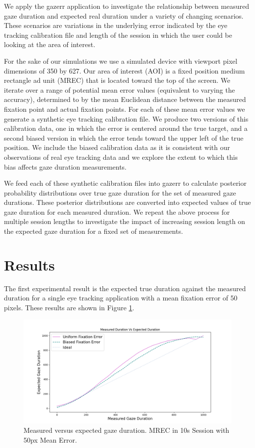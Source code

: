 \documentclass[12pt,a4paper]{article}
\numberwithin{equation}{section}
\begin{document}
We apply the gazerr application to investigate the relationship between measured gaze duration
and expected real duration under a variety of changing scenarios. These scenarios are variations
in the underlying error indicated by the eye tracking calibration file and length of the session
in which the user could be looking at the area of interest.

For the sake of our simulations we use a simulated device with viewport pixel 
dimensions of 350 by 627. Our area of interest (AOI) is a fixed position medium rectangle ad unit (MREC)
that is located toward the top of the screen. We iterate over a range of potential mean error
values (equivalent to varying the accuracy), determined to by the mean Euclidean distance 
between the measured fixation point and actual fixation points.
For each of these mean error values we generate a synthetic eye tracking calibration file. We produce
two versions of this calibration data, one in which the error is centered around the true target,
and a second biased version in which the error tends toward the upper left of the true position. We 
include the biased calibration data as it is consistent with our observations of real eye tracking data
and we explore the extent to which this bias affects gaze duration measurements.

We feed each of these synthetic calibration files into gazerr to calculate posterior probability
distributions over true gaze duration for the set of measured gaze durations. These posterior
distributions are converted into expected values of true gaze duration for each measured duration.
We repeat the above process for multiple session lengths to investigate the impact of increasing
session length on the expected gaze duration for a fixed set of measurements.

\section{Results}

The first experimental result is the expected true duration against the measured duration
for a single eye tracking application with a mean fixation error of 50 pixels. These
results are shown in Figure \ref{fig:measured_vs_expected}.

\begin{figure}[h!]
\includegraphics[scale=0.5]{../results/Measured_vs_expected.png}
\caption{Measured versus expected gaze duration. MREC in 10s Session with 50px Mean Error.}
\label{fig:measured_vs_expected}
\end{figure}
\end{document}
